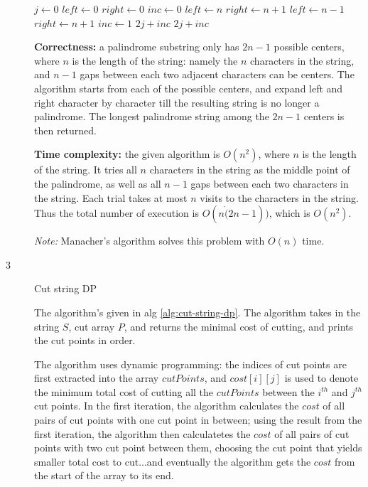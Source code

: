 \documentclass{article}
\begin{document}
\begin{description}
\begin{algorithm}[H]
\begin{algorithmic}[1]
      \State $j \gets 0$
      \State $left \gets 0$
      \State $right \gets 0$
      \State $inc \gets 0$
        \State $left \gets n$
        \State $right \gets n+1$
        \State $left \gets n-1$
        \State $right \gets n+1$
        \State $inc \gets 1$
      \EndIf
          \State \Return $2j + inc$
        \EndIf
      \EndFor
      \State \Return $2j + inc$
    \EndFunction

    \end{algorithmic}
  \end{algorithm}

  \textbf{Correctness:} a palindrome substring only has $2n - 1$ possible centers, where $n$ is the length of the string: namely the $n$ characters in the string, and $n-1$ gaps between each two adjacent characters can be centers. The algorithm starts from each of the possible centers, and expand left and right character by character till the resulting string is no longer a palindrome. The longest palindrome string among the $2n - 1$ centers is then returned. 

  \textbf{Time complexity:} the given algorithm is $O(n^2)$, where $n$ is the length of the string. It tries all $n$ characters in the string as the middle point of the palindrome, as well as all $n-1$ gaps between each two characters in the string. Each trial takes at most $n$ visits to the characters in the string. Thus the total number of execution is $O(n \dot (2n - 1))$, which is $O(n^2)$.

  \textit{Note:} Manacher's algorithm solves this problem with $O(n)$ time.

\item[3]{Cut string DP}

  The algorithm's given in alg \ref{alg:cut-string-dp}. The algorithm takes in the string $S$, cut array $P$, and returns the minimal cost of cutting, and prints the cut points in order.

  The algorithm uses dynamic programming: the indices of cut points are first extracted into the array $cutPoints$, and $cost[i][j]$ is used to denote the minimum total cost of cutting all the $cutPoints$ between the $i^{th}$ and $j^{th}$ cut points. In the first iteration, the algorithm calculates the $cost$ of all pairs of cut points with one cut point in between; using the result from the first iteration, the algorithm then calculatetes the $cost$ of all pairs of cut points with two cut point between them, choosing the cut point that yields smaller total cost to cut...and eventually the algorithm gets the $cost$ from the start of the array to its end.


\end{description}
\end{document}
